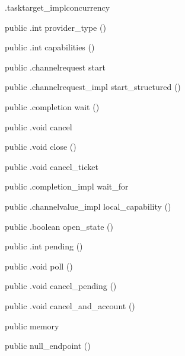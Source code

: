 \begin{CrexxClass}{.tasktarget\_impl}{concurrency}
\begin{Members}
    \Method
      {public}
      {.int}
      {provider\_type}
      {()}

    \Method
      {public}
      {.int}
      {capabilities}
      {()}

    \Method
      {public}
      {.channelrequest}
      {start}
      {}

    \Method
      {public}
      {.channelrequest\_impl}
      {start\_structured}
      {()}

    \Method
      {public}
      {.completion}
      {wait}
      {()}

    \Method
      {public}
      {.void}
      {cancel}
      {}

    \Method
      {public}
      {.void}
      {close}
      {()}

    \Method
      {public}
      {.void}
      {cancel\_ticket}
      {}

    \Method
      {public}
      {.completion\_impl}
      {wait\_for}
      {}

    \Method
      {public}
      {.channelvalue\_impl}
      {local\_capability}
      {()}

    \Method
      {public}
      {.boolean}
      {open\_state}
      {()}

    \Method
      {public}
      {.int}
      {pending}
      {()}

    \Method
      {public}
      {.void}
      {poll}
      {()}

    \Method
      {public}
      {.void}
      {cancel\_pending}
      {()}

    \Method
      {public}
      {.void}
      {cancel\_and\_account}
      {()}

    \Factory
      {public}
      {memory}
      {}

    \Factory
      {public}
      {null\_endpoint}
      {()}


\end{Members}
\end{CrexxClass}

